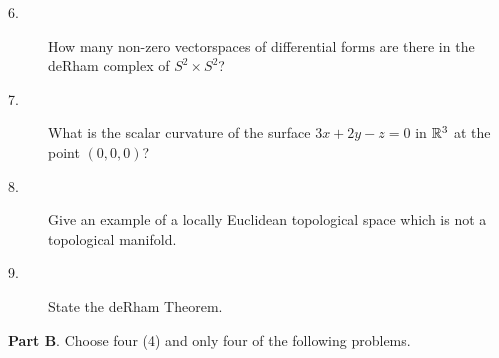 \documentclass{article}
\begin{document}
\begin{description}
\item[6.]
How many non-zero vectorspaces of differential forms are there in the
deRham complex of $S^2 \times S^2$?

\item[7.]
What is the scalar curvature of the surface $3x+2y - z = 0$ in
$\Bbb R^3$ at the point $(0,0,0)$?

\item[8.]
Give an example of a locally Euclidean topological space which is not a
topological manifold.

\item[9.]
State the deRham Theorem.

\end{description}

{\bf Part B}. Choose four (4) and only four of the following problems.
\end{document}
